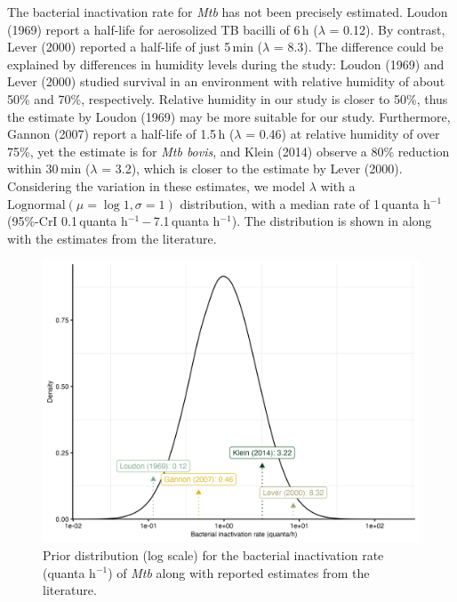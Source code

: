 \documentclass[fleqn,11pt]{wlscirep_supp}
\begin{document}
The bacterial inactivation rate for \emph{Mtb} has not been precisely estimated. Loudon (1969)\cite{Loudon1969AMRRD} report a half-life for aerosolized TB bacilli of 6\,h ($\lambda$ = 0.12). By contrast, Lever (2000)\cite{Lever2000LettersAppliedMicrobio} reported a half-life of just 5\,min ($\lambda$ = 8.3). The difference could be explained by differences in humidity levels during the study\cite{Lever2000LettersAppliedMicrobio}: Loudon (1969) and Lever (2000) studied survival in an environment with relative humidity of about 50\% and 70\%, respectively. Relative humidity in our study is closer to 50\%, thus the estimate by Loudon (1969) may be more suitable for our study. Furthermore, Gannon (2007)\cite{Gannon2007ResVetSci} report a half-life of 1.5\,h ($\lambda$ = 0.46) at relative humidity of over 75\%, yet the estimate is for \emph{Mtb bovis}, and Klein (2014)\cite{Klein2014IJMyco} observe a 80\% reduction within 30\,min ($\lambda$ = 3.2), which is closer to the estimate by Lever (2000). Considering the variation in these estimates, we model $\lambda$ with a $\mathrm{Lognormal}(\mu = \log 1, \sigma = 1)$ distribution, with a median rate of 1\,quanta h$^{-1}$ (95\%-CrI 0.1\,quanta h$^{-1}$\,$-$\,7.1\,quanta h$^{-1}$). The distribution is shown in  along with the estimates from the literature.

\begin{figure}[!htpb]
    \centering
    \includegraphics{results/inputs/bacterial-inactivation-rate.png}
    \caption{Prior distribution (log scale) for the bacterial inactivation rate (quanta h$^{-1}$) of \emph{Mtb} along with reported estimates from the literature\cite{Loudon1969AMRRD,Gannon2007ResVetSci,Klein2014IJMyco,Lever2000LettersAppliedMicrobio}.}
    \label{fig:lambda-distribution}
\end{figure}
\end{document}

